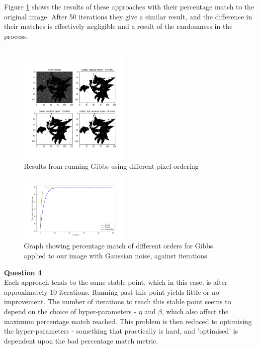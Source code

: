 \documentclass[10pt, a4paper, twocolumn]{article} %
\begin{document}
Figure \ref{fig:GibbOrderHaunter} shows the results of these approaches with their percentage match to the original image. After 50 iterations they give a similar result, and the difference in their matches is effectively negligible and a result of the randomness in the process.\\\\
\begin{figure}
    \centering
    \includegraphics[width=0.48\textwidth]{images/HaunterGibbGridGuassian.png}
    \caption{Results from running Gibbs using different pixel ordering}
    \label{fig:GibbOrderHaunter}
\end{figure}
\begin{figure}
    \centering
    \includegraphics[width=0.48\textwidth]{images/GibbGuassianMatch.png}
    \caption{Graph showing percentage match of different orders for Gibbs applied to our image with Gaussian noise, against iterations}
    \label{fig:GibbOrderComp}
\end{figure}

\noindent\textbf{Question 4}\\
Each approach tends to the same stable point, which in this case, is after approximately 10 iterations. Running past this point yields little or no improvement. The number of iterations to reach this stable point seems to depend on the choice of hyper-parameters - $\eta$ and $\beta$, which also affect the maximum percentage match reached. This problem is then reduced to optimising the hyper-parameters - something that practically is hard, and 'optimised' is dependent upon the bad percentage match metric. 
\end{document}
